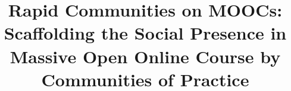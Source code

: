 \documentclass[format=acmsmall, review=false, screen=true]{acmart}
\begin{document}
\title[Rapid Communities on MOOCs]{Rapid Communities on MOOCs: Scaffolding the Social Presence in Massive Open Online Course by Communities of Practice }






\renewcommand{\shortauthors}{Anonymous}
\end{document}
